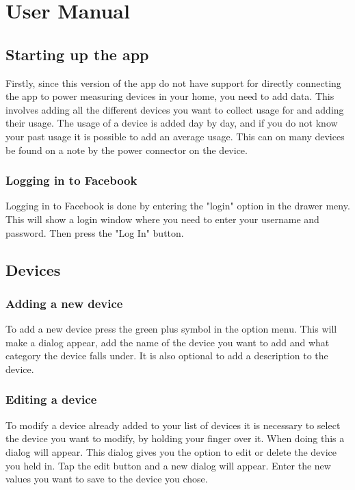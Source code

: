 \chapter{User Manual}

\section{Starting up the app}
Firstly, since this version of the app do not have support for directly connecting the app to power measuring devices in your home, you need to add data. This involves adding all the different devices you want to collect usage for and adding their usage. The usage of a device is added day by day, and if you do not know your past usage it is possible to add an average usage. This can on many devices be found on a note by the power connector on the device.

\subsection{Logging in to Facebook}
Logging in to Facebook is done by entering the "login" option in the drawer meny. This will show a login window where you need to enter your username and password. Then press the "Log In" button. 

\label{sec:devices}
\section{Devices}
\subsection{Adding a new device}
To add a new device press the green plus symbol in the option menu. This will make a dialog appear, add the name of the device you want to add and what category the device falls under. It is also optional to add a description to the device.

\subsection{Editing a device}
To modify a device already added to your list of devices it is necessary to select the device you want to modify, by holding your finger over it. When doing this a dialog will appear. This dialog gives you the option to edit or delete the device you held in. Tap the edit button and a new dialog will appear. Enter the new values you want to save to the device you chose.

